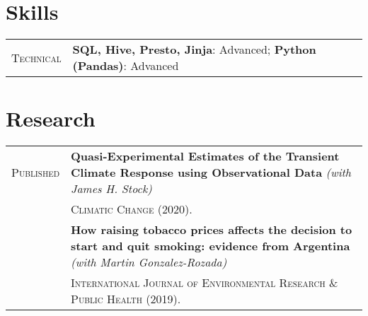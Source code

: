 \documentclass[letterpaper,9pt]{article} %
\begin{document}
	
\section{Skills}
\begin{tabular}[htb]{>{\raggedleft\arraybackslash}p{}|p{}}
	\textsc{Technical} & \textbf{SQL, Hive, Presto, Jinja}: Advanced; \textbf{Python (Pandas)}: Advanced
\end{tabular}

\section{Research}


\begin{tabular}{>{\raggedleft\arraybackslash}p{}|p{}}
	\textsc{Published} & \textbf{Quasi-Experimental Estimates of the Transient Climate Response using Observational Data} \emph{(with James H. Stock)} \\
	& \textsc{Climatic Change (2020).}\\
	& \textbf{How raising tobacco prices
		affects the decision to start and quit smoking: evidence from Argentina}   \emph{(with Martin Gonzalez-Rozada)} \\
	& \textsc{International
		Journal of Environmental Research \& Public Health (2019).} 
\end{tabular}

	
\end{document}
